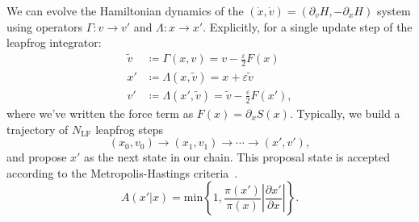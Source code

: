 \documentclass[a4paper,11pt]{article}
\begin{document}
%
We can evolve the Hamiltonian dynamics of the $(\dot{x}, \dot{v}) =
(\partial_{v} H, -\partial_{x} H)$ system using operators $\Gamma: v
\rightarrow v'$ and $\Lambda: x \rightarrow x'$.
%
Explicitly, for a single update step of the leapfrog integrator:
%
\begin{align}
\tilde{v} &\coloneqq \Gamma(x, v) = v - \frac{\varepsilon}{2} F(x) \\
x' &\coloneqq \Lambda(x, \tilde{v}) = x + \varepsilon \tilde{v} \\
v' &\coloneqq \Lambda(x', \tilde{v}) = \tilde{v} - \frac{\varepsilon}{2} F(x'),
\end{align}
%
where we've written the force term as $F(x) = \partial_{x}S(x)$.
%
Typically, we build a trajectory of $N_{\mathrm{LF}}$ leapfrog steps
%
\begin{equation}
(x_{0}, v_{0}) \rightarrow (x_{1}, v_{1}) \rightarrow \cdots \rightarrow (x', v'),
\end{equation}
%
and propose $x'$ as the next state in our chain.
%
This proposal state is accepted according to the Metropolis-Hastings
criteria~\cite{mh}.
%
\begin{equation}
A(x'|x) = \mathrm{min}\left\{{1, \frac{\pi(x')}{\pi(x)} \left| \frac{\partial x'}{\partial x} \right|}\right\}.
\end{equation}
%
\end{document}
